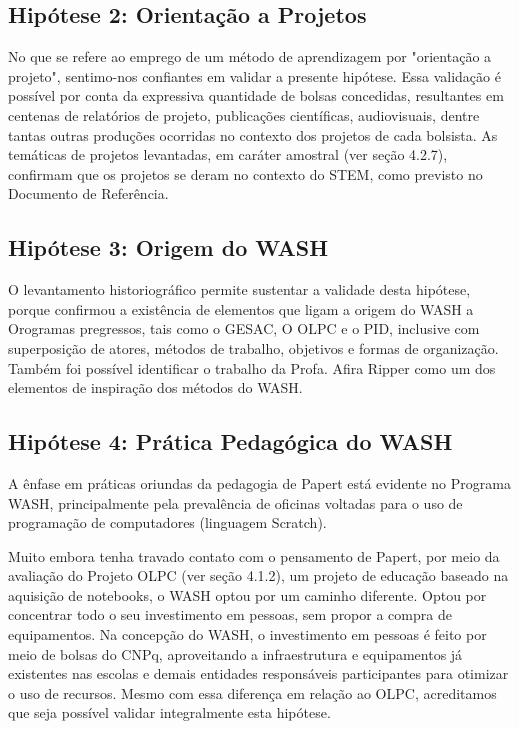 \subsection[Hipótese 2: Orientação a Projetos]{Hipótese 2: Orientação a Projetos}\label{Hipótese 2: Orientação a Projetos}
No que se refere ao emprego de um método de aprendizagem por "orientação a projeto", sentimo-nos confiantes em validar a presente hipótese. Essa validação é possível por conta da expressiva quantidade de bolsas concedidas, resultantes em centenas de relatórios de projeto, publicações científicas, audiovisuais, dentre tantas outras produções ocorridas no contexto dos projetos de cada bolsista. As temáticas de projetos levantadas, em caráter amostral (ver seção 4.2.7), confirmam que os projetos se deram no contexto do STEM, como previsto no Documento de Referência.

\subsection[Hipótese 3: Origem do WASH]{Hipótese 3: Origem do WASH}\label{Hipótese 3: Origem do WASH}
O levantamento historiográfico permite sustentar a validade desta hipótese, porque confirmou a existência de elementos que ligam a origem do WASH a Orogramas pregressos, tais como o GESAC, O OLPC e o PID, inclusive com superposição de atores, métodos de trabalho, objetivos e formas de organização. Também foi possível identificar o trabalho da Profa. Afira Ripper como um dos elementos de inspiração dos métodos do WASH.

\subsection[Hipótese 4: Prática Pedagógica do WASH]{Hipótese 4: Prática Pedagógica do WASH}\label{Hipótese 4: Prática Pedagógica do WASH}
A ênfase em práticas oriundas da pedagogia de Papert está evidente no Programa WASH, principalmente pela prevalência de oficinas voltadas para o uso de programação de computadores (linguagem Scratch).

Muito embora tenha travado contato com o pensamento de Papert, por meio da avaliação do Projeto OLPC (ver seção 4.1.2), um projeto de educação baseado na aquisição de notebooks, o WASH optou por um caminho diferente. Optou por concentrar todo o seu investimento em pessoas, sem propor a compra de equipamentos. Na concepção do WASH, o investimento em pessoas é feito por meio de bolsas do CNPq, aproveitando a infraestrutura e equipamentos já existentes nas escolas e demais entidades responsáveis participantes para otimizar o uso de recursos.  Mesmo com essa diferença em relação ao OLPC, acreditamos que seja possível validar integralmente esta hipótese.

